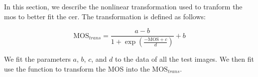 In this section, we describe the nonlinear transformation used to tranform the \gls{mos} to better fit the \gls{cer}.
The transformation is defined as follows:

\begin{equation}
    \text{MOS}_{trans} = \frac{a - b}{1 + \exp \left( \frac{-\text{MOS} + c}{d} \right)} + b
    \label{eq:nonlinear}
\end{equation}
    
We fit the parameters \(a\), \(b\), \(c\), and \(d\) to the data of all the test images. We then fit use the function to transform the MOS into the $\text{MOS}_{trans}$.
